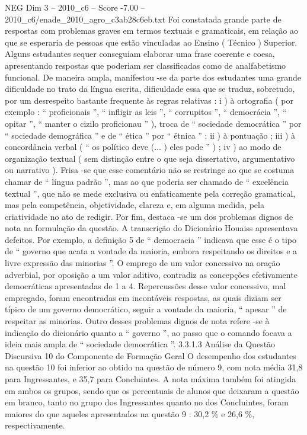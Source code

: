 \begin{textsample}{NEG Dim 3 – 2010\_c6 – Score -7.00 – 2010\_c6/enade\_2010\_agro\_c3ab28c6eb.txt}
Foi constatada grande parte de respostas com problemas graves em termos textuais e gramaticais, em relação ao que se esperaria de pessoas que estão vinculadas ao Ensino ( Técnico ) Superior.
Alguns estudantes sequer conseguiam elaborar uma frase coerente e coesa, apresentando respostas que poderiam ser classificadas como de analfabetismo funcional.
De maneira ampla, manifestou -se da parte dos estudantes uma grande dificuldade no trato da língua escrita, dificuldade essa que se traduz, sobretudo, por um desrespeito bastante frequente às regras relativas : i ) à ortografia ( por exemplo : “ proficionais ”, “ infligir as leis ”, “ corrupitos ”, “ democrácia ”, “ opitar ”, “ manter o cizilo proficionau ” ), troca de “ sociedade democrática ” por “ sociedade demográfica ” e de “ ética ” por “ étnica ” ; ii ) à pontuação ; iii ) à concordância verbal ( “ os político deve (... ) eles pode ” ) ; iv ) ao modo de organização textual ( sem distinção entre o que seja dissertativo, argumentativo ou narrativo ).
Frisa -se que esse comentário não se restringe ao que se costuma chamar de “ língua padrão ”, mas ao que poderia ser chamado de “ excelência textual ”, que não se mede exclusiva ou enfaticamente pela correção gramatical, mas pela competência, objetividade, clareza e, em alguma medida, pela criatividade no ato de redigir.
Por fim, destaca -se um dos problemas dignos de nota na formulação da questão.
A transcrição do Dicionário Houaiss apresentava defeitos.
Por exemplo, a definição 5 de “ democracia ” indicava que esse é o tipo de “ governo que acata a vontade da maioria, embora respeitando os direitos e a livre expressão das minorias ”.
O emprego de um valor concessivo na oração adverbial, por oposição a um valor aditivo, contradiz as concepções efetivamente democráticas apresentadas de 1 a 4.
Repercussões desse valor concessivo, mal empregado, foram encontradas em incontáveis respostas, as quais diziam ser típico de um governo democrático, seguir a vontade da maioria, “ apesar ” de respeitar as minorias.
Outro desses problemas dignos de nota refere -se à indicação do dicionário quanto a “ governo ”, ao passo que o comando focava a ideia mais ampla de “ sociedade democrática ”. 3.3.1.3 Análise da Questão Discursiva 10 do Componente de Formação Geral O desempenho dos estudantes na questão 10 foi inferior ao obtido na questão de número 9, com nota média 31,8 para Ingressantes, e 35,7 para Concluintes.
A nota máxima também foi atingida em ambos os grupos, sendo que os percentuais de alunos que deixaram a questão em branco, tanto no grupo dos Ingressantes quanto no dos Concluintes, foram maiores do que aqueles apresentados na questão 9 : 30,2 \% e 26,6 \%, respectivamente.

\end{textsample}
